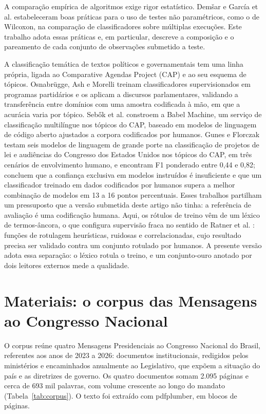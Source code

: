 \documentclass[fleqn,10pt]{SelfArx}
\begin{document}
A comparação empírica de algoritmos exige rigor estatístico. Demšar \cite{demsar2006} e García et al. \cite{garcia2010} estabeleceram boas práticas para o uso de testes não paramétricos, como o de Wilcoxon, na comparação de classificadores sobre múltiplas execuções. Este trabalho adota essas práticas e, em particular, descreve a composição e o pareamento de cada conjunto de observações submetido a teste.

A classificação temática de textos políticos e governamentais tem uma linha própria, ligada ao Comparative Agendas Project (CAP) e ao seu esquema de tópicos. Osnabrügge, Ash e Morelli \cite{osnabrugge2023} treinam classificadores supervisionados em programas partidários e os aplicam a discursos parlamentares, validando a transferência entre domínios com uma amostra codificada à mão, em que a acurácia varia por tópico. Sebők et al. \cite{sebok2024} constroem a Babel Machine, um serviço de classificação multilíngue nos tópicos do CAP, baseado em modelos de linguagem de código aberto ajustados a corpora codificados por humanos. Gunes e Florczak \cite{gunes2025} testam seis modelos de linguagem de grande porte na classificação de projetos de lei e audiências do Congresso dos Estados Unidos nos tópicos do CAP, em três cenários de envolvimento humano, e encontram F1 ponderado entre 0,44 e 0,82; concluem que a confiança exclusiva em modelos instruídos é insuficiente e que um classificador treinado em dados codificados por humanos supera a melhor combinação de modelos em 13 a 16 pontos percentuais. Esses trabalhos partilham um pressuposto que a versão submetida deste artigo não tinha: a referência de avaliação é uma codificação humana. Aqui, os rótulos de treino vêm de um léxico de termos-âncora, o que configura supervisão fraca no sentido de Ratner et al. \cite{ratner2017}: funções de rotulagem heurísticas, ruidosas e correlacionadas, cujo resultado precisa ser validado contra um conjunto rotulado por humanos. A presente versão adota essa separação: o léxico rotula o treino, e um conjunto-ouro anotado por dois leitores externos mede a qualidade.

\section{Materiais: o corpus das Mensagens ao Congresso Nacional}
\label{sec:corpus}

O corpus reúne quatro Mensagens Presidenciais ao Congresso Nacional do Brasil, referentes aos anos de 2023 a 2026: documentos institucionais, redigidos pelos ministérios e encaminhados anualmente ao Legislativo, que expõem a situação do país e as diretrizes de governo. Os quatro documentos somam 2.095 páginas e cerca de 693 mil palavras, com volume crescente ao longo do mandato (Tabela~\ref{tab:corpus}). O texto foi extraído com pdfplumber, em blocos de páginas.
\end{document}
